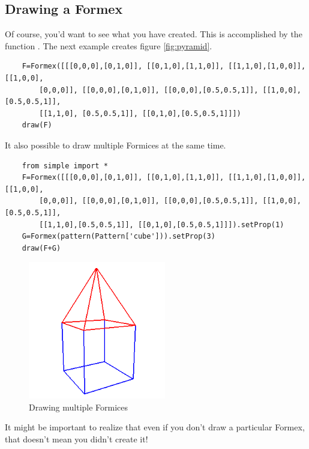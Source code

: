 \subsection{Drawing a Formex}
\outdated

\label{subsec:drawing}
Of course, you'd want to see what you have created. This is accomplished by the function . The next example creates figure \ref{fig:pyramid}. 
\begin{verbatim}
	F=Formex([[[0,0,0],[0,1,0]], [[0,1,0],[1,1,0]], [[1,1,0],[1,0,0]], [[1,0,0], 
		[0,0,0]], [[0,0,0],[0,1,0]], [[0,0,0],[0.5,0.5,1]], [[1,0,0],[0.5,0.5,1]], 
		[[1,1,0], [0.5,0.5,1]], [[0,1,0],[0.5,0.5,1]]])
	draw(F)
\end{verbatim}

It also possible to draw multiple Formices at the same time.
\begin{verbatim}
	from simple import *
	F=Formex([[[0,0,0],[0,1,0]], [[0,1,0],[1,1,0]], [[1,1,0],[1,0,0]], [[1,0,0],
		[0,0,0]], [[0,0,0],[0,1,0]], [[0,0,0],[0.5,0.5,1]], [[1,0,0],[0.5,0.5,1]], 
		[[1,1,0],[0.5,0.5,1]], [[0,1,0],[0.5,0.5,1]]]).setProp(1)	
	G=Formex(pattern(Pattern['cube'])).setProp(3)
	draw(F+G)
\end{verbatim}
\begin{figure}[ht]
  \centering
  \begin{makeimage}
  \end{makeimage}
  \begin{latexonly}
    \includegraphics[width=6cm]{images/house}
  \end{latexonly}
  \begin{htmlonly}
  \end{htmlonly}  
  \caption{Drawing multiple Formices}
  \label{fig:multiple}
\end{figure}
 
It might be important to realize that even if you don't draw a particular Formex, that doesn't mean you didn't create it!

